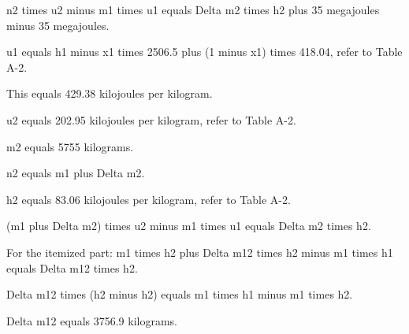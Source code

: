 n2 times u2 minus m1 times u1 equals Delta m2 times h2 plus 35 megajoules minus 35 megajoules.

u1 equals h1 minus x1 times 2506.5 plus (1 minus x1) times 418.04, refer to Table A-2.

This equals 429.38 kilojoules per kilogram.

u2 equals 202.95 kilojoules per kilogram, refer to Table A-2.

m2 equals 5755 kilograms.

n2 equals m1 plus Delta m2.

h2 equals 83.06 kilojoules per kilogram, refer to Table A-2.

(m1 plus Delta m2) times u2 minus m1 times u1 equals Delta m2 times h2.

For the itemized part:
m1 times h2 plus Delta m12 times h2 minus m1 times h1 equals Delta m12 times h2.

Delta m12 times (h2 minus h2) equals m1 times h1 minus m1 times h2.

Delta m12 equals 3756.9 kilograms.